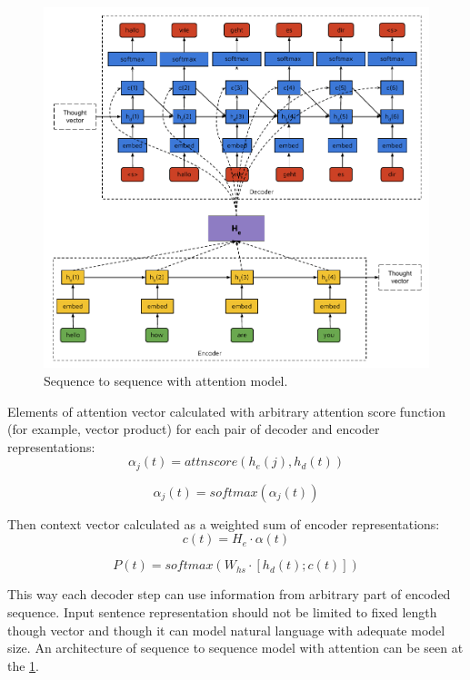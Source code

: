 \begin{figure}
\centering
\includegraphics{Figures/seq2seq}
\decoRule
\caption[Sequence to sequence model]{Sequence to sequence with attention model.}
\label{fig:seq2seq}
\end{figure}

Elements of attention vector calculated with arbitrary attention score function (for example, vector product) for each pair of decoder and encoder representations:
\begin{equation}
\alpha_j(t) = attnscore(h_e(j), h_d(t))
\label{attn:alpha}
\end{equation}

\begin{equation}
\alpha_j(t) = softmax(\alpha_j(t))
\label{attn:alpha2}
\end{equation}

Then context vector calculated as a weighted sum of encoder representations:
\begin{equation}
	c(t) = H_e\cdot\alpha(t)
	\label{attn:c}
\end{equation}

\begin{equation}
	P(t) = softmax(W_{hs}\cdot[h_d(t);c(t)])
\label{attn:P}
\end{equation}

This way each decoder step can use information from arbitrary part of encoded sequence. Input sentence representation should not be limited to fixed length though vector and though it can model natural language with adequate model size. An architecture of sequence to sequence model with attention can be seen at the \ref{fig:seq2seq}.

